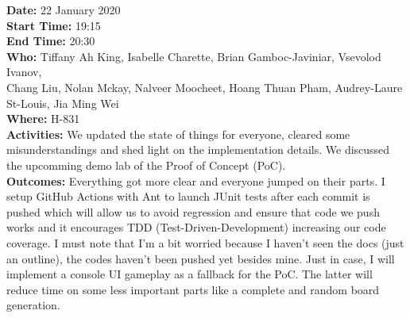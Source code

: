 \documentclass[12pt]{article}
\begin{document}
{\bf Date:} 22 January 2020\\
{\bf Start Time:} 19:15\\
{\bf End Time:} 20:30\\
{\bf Who:} Tiffany Ah King, Isabelle Charette, Brian Gamboc-Javiniar, Vsevolod Ivanov,\\
Chang Liu, Nolan Mckay, Nalveer Moocheet, Hoang Thuan Pham, Audrey-Laure St-Louis, Jia Ming Wei\\
{\bf Where:} H-831\\
{\bf Activities:} We updated the state of things for everyone, cleared some misunderstandings and shed light on the implementation details. We discussed the upcomming demo lab of the Proof of Concept (PoC).\\
{\bf Outcomes:} Everything got more clear and everyone jumped on their parts. I setup GitHub Actions with Ant to launch JUnit tests after each commit is pushed which will allow us to avoid regression and ensure that code we push works and it encourages TDD (Test-Driven-Development) increasing our code coverage. I must note that I'm a bit worried because I haven't seen the docs (just an outline), the codes haven't been pushed yet besides mine. Just in case, I will implement a console UI gameplay as a fallback for the PoC. The latter will reduce time on some less important parts like a complete and random board generation.\\


\end{document}
